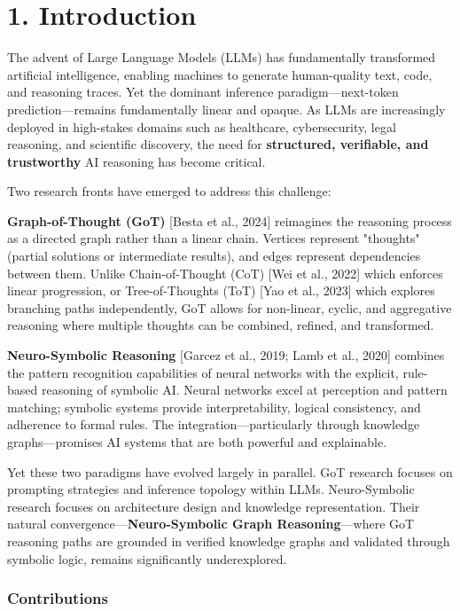 \documentclass[11pt,a4paper]{article}
\begin{document}
\section{1. Introduction}

The advent of Large Language Models (LLMs) has fundamentally transformed artificial intelligence, enabling machines to generate human-quality text, code, and reasoning traces. Yet the dominant inference paradigm—next-token prediction—remains fundamentally linear and opaque. As LLMs are increasingly deployed in high-stakes domains such as healthcare, cybersecurity, legal reasoning, and scientific discovery, the need for \textbf{structured, verifiable, and trustworthy} AI reasoning has become critical.

Two research fronts have emerged to address this challenge:

\textbf{Graph-of-Thought (GoT)} [Besta et al., 2024] reimagines the reasoning process as a directed graph rather than a linear chain. Vertices represent "thoughts" (partial solutions or intermediate results), and edges represent dependencies between them. Unlike Chain-of-Thought (CoT) [Wei et al., 2022] which enforces linear progression, or Tree-of-Thoughts (ToT) [Yao et al., 2023] which explores branching paths independently, GoT allows for non-linear, cyclic, and aggregative reasoning where multiple thoughts can be combined, refined, and transformed.

\textbf{Neuro-Symbolic Reasoning} [Garcez et al., 2019; Lamb et al., 2020] combines the pattern recognition capabilities of neural networks with the explicit, rule-based reasoning of symbolic AI. Neural networks excel at perception and pattern matching; symbolic systems provide interpretability, logical consistency, and adherence to formal rules. The integration—particularly through knowledge graphs—promises AI systems that are both powerful and explainable.

Yet these two paradigms have evolved largely in parallel. GoT research focuses on prompting strategies and inference topology within LLMs. Neuro-Symbolic research focuses on architecture design and knowledge representation. Their natural convergence—\textbf{Neuro-Symbolic Graph Reasoning}—where GoT reasoning paths are grounded in verified knowledge graphs and validated through symbolic logic, remains significantly underexplored.

\subsubsection{Contributions}
\end{document}
